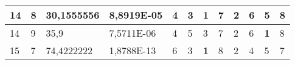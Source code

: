 \documentclass[conference]{IEEEtran}
\begin{document}
\begin{table*}[]
\begin{tabular}{|llll|llllllll|}
\multicolumn{1}{|l|}{14}                                                    & \multicolumn{1}{l|}{8}                                                        & \multicolumn{1}{l|}{30,1555556}                                                   & 8,8919E-05                     & \multicolumn{1}{l|}{4}                                                  & \multicolumn{1}{l|}{3}                                                  & \multicolumn{1}{l|}{\textbf{1}}                                         & \multicolumn{1}{l|}{7}                                                  & \multicolumn{1}{l|}{2}                                                  & \multicolumn{1}{l|}{6}                                                  & \multicolumn{1}{l|}{5}                                                  & 8                          \\ \hline
\multicolumn{1}{|l|}{14}                                                    & \multicolumn{1}{l|}{9}                                                        & \multicolumn{1}{l|}{35,9}                                                         & 7,5711E-06                     & \multicolumn{1}{l|}{4}                                                  & \multicolumn{1}{l|}{5}                                                  & \multicolumn{1}{l|}{3}                                                  & \multicolumn{1}{l|}{7}                                                  & \multicolumn{1}{l|}{2}                                                  & \multicolumn{1}{l|}{6}                                                  & \multicolumn{1}{l|}{\textbf{1}}                                         & 8                          \\ \hline
\multicolumn{1}{|l|}{15}                                                    & \multicolumn{1}{l|}{7}                                                        & \multicolumn{1}{l|}{74,4222222}                                                   & 1,8788E-13                     & \multicolumn{1}{l|}{6}                                                  & \multicolumn{1}{l|}{3}                                                  & \multicolumn{1}{l|}{\textbf{1}}                                         & \multicolumn{1}{l|}{8}                                                  & \multicolumn{1}{l|}{2}                                                  & \multicolumn{1}{l|}{4}                                                  & \multicolumn{1}{l|}{5}                                                  & 7                          \\ \hline

\end{tabular}
\end{table*}
\end{document}
